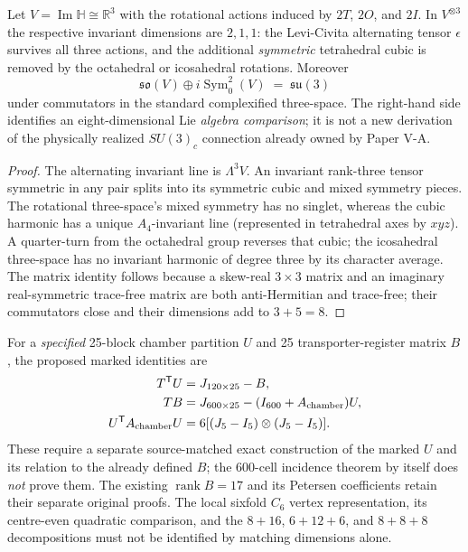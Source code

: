 \documentclass[11pt]{article}
\begin{document}
\begin{proposition}
\label{p1:prop:v365-cubic-algebra-color}
Let $V=\operatorname{Im}\mathbb H\cong\mathbb R^3$ with the rotational
actions induced by $2T$, $2O$, and $2I$.  In $V^{\otimes3}$ the
respective invariant dimensions are $2,1,1$: the Levi-Civita
alternating tensor $\epsilon$ survives all three actions, and the
additional \emph{symmetric} tetrahedral cubic is removed by the
octahedral or icosahedral rotations.  Moreover
\[
 \mathfrak{so}(V)\oplus i\operatorname{Sym}_0^2(V)
   \;=\;\mathfrak{su}(3)
\]
under commutators in the standard complexified three-space.  The
right-hand side identifies an eight-dimensional Lie \emph{algebra
comparison}; it is not a new derivation of the physically realized
$SU(3)_c$ connection already owned by Paper V-A.
\end{proposition}
\begin{proof}
The alternating invariant line is $\Lambda^3V$.  An invariant
rank-three tensor symmetric in any pair splits into its symmetric
cubic and mixed symmetry pieces.  The rotational three-space's mixed
symmetry has no singlet, whereas the cubic harmonic has a unique
$A_4$-invariant line (represented in tetrahedral axes by $xyz$).
A quarter-turn from the octahedral group reverses that cubic;
the icosahedral three-space has no invariant harmonic of degree
three by its character average.  The matrix identity follows because
a skew-real $3\times3$ matrix and an imaginary real-symmetric
trace-free matrix are both anti-Hermitian and trace-free; their
commutators close and their dimensions add to $3+5=8$.
\end{proof}

\begin{remark}
\label{p1:rem:v365-chamber-register-candidate}
For a \emph{specified} 25-block chamber partition $U$ and 25
transporter-register matrix $B$, the proposed marked identities are
\[
\begin{aligned}
 T^{\mathsf T}U&=J_{120\times25}-B,\\
 TB&=J_{600\times25}-(I_{600}+A_{\rm chamber})U,\\
 U^{\mathsf T}A_{\rm chamber}U&=6[(J_5-I_5)\otimes(J_5-I_5)].
\end{aligned}
\]
These require a separate source-matched exact construction of the
marked $U$ and its relation to the already defined $B$; the
$600$-cell incidence theorem by itself does \emph{not} prove them.
The existing $\operatorname{rank}B=17$ and its Petersen
coefficients retain their separate original proofs.  The local
sixfold $C_6$ vertex representation, its centre-even quadratic
comparison, and the $8+16$, $6+12+6$, and $8+8+8$ decompositions
must not be identified by matching dimensions alone.
\end{remark}
\end{document}
